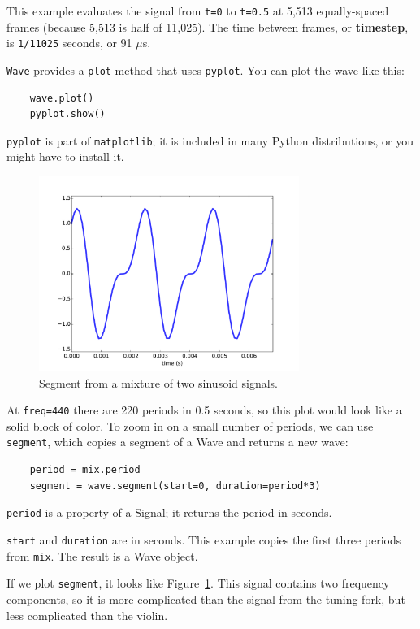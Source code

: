 \documentclass[12pt]{book}
\begin{document}
This example evaluates the signal from {\tt t=0} to {\tt t=0.5} at
5,513 equally-spaced frames (because 5,513 is half of 11,025).
The time between frames, or {\bf timestep}, is {\tt 1/11025} seconds, or
91 $\mu$s.

{\tt Wave} provides a {\tt plot} method that uses {\tt pyplot}.
You can plot the wave like this:

\begin{verbatim}
    wave.plot()
    pyplot.show()
\end{verbatim}

{\tt pyplot} is part of {\tt matplotlib}; it is included in many
Python distributions, or you might have to install it.

\begin{figure}
\centerline{\includegraphics[height=2.5in]{figs/example1.pdf}}
\caption{Segment from a mixture of two sinusoid signals.}
\label{fig.example1}
\end{figure}

At {\tt freq=440} there are 220 periods in 0.5 seconds, so this plot
would look like a solid block of color.  To zoom in on a small number
of periods, we can use {\tt segment}, which copies a segment of a Wave
and returns a new wave:

\begin{verbatim}
    period = mix.period
    segment = wave.segment(start=0, duration=period*3)
\end{verbatim}

{\tt period} is a property of a Signal; it returns the period in seconds.

{\tt start} and {\tt duration} are in seconds.  This example copies
the first three periods from {\tt mix}.  The result is a Wave object.

If we plot {\tt segment}, it looks like Figure~\ref{fig.example1}.
This signal contains two frequency components, so it is more
complicated than the signal from the tuning fork, but less complicated
than the violin.
\end{document}
